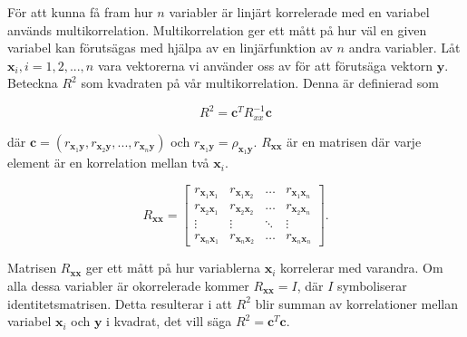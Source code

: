 För att kunna få fram hur $n$ variabler är linjärt korrelerade med en variabel används multikorrelation. Multikorrelation ger ett mått på hur väl en given variabel kan förutsägas med hjälpa av en linjärfunktion av $n$ andra variabler. Låt $\mathbf{x}_{i}, i = 1, 2, ..., n$ vara vektorerna vi använder oss av för att förutsäga vektorn $\mathbf{y}$. Beteckna $R^2$ som kvadraten på vår multikorrelation. Denna är definierad som \cite{Wiki}

\begin{equation}
    R^{2} = \mathbf{c}^{T}R_{xx}^{-1}\mathbf{c}
\end{equation}

\noindent
där $\mathbf{c} = (r_{\mathbf{x}_1\mathbf{y}}, r_{\mathbf{x}_2\mathbf{y}}, ..., r_{\mathbf{x}_n\mathbf{y}})$ och $r_{\mathbf{x}_1\mathbf{y}} = \rho_{\mathbf{x}_1\mathbf{y}}$. $R_{\mathbf{xx}}$ är en matrisen där varje element är en korrelation mellan två $\mathbf{x}_i$. 

 
\begin{equation}
    R_{\mathbf{xx}} = 
    \begin{bmatrix}
    r_{\mathbf{x}_1\mathbf{x}_1} & r_{\mathbf{x}_1\mathbf{x}_2} &  \dots  & r_{\mathbf{x}_1\mathbf{x}_n} \\
    r_{\mathbf{x}_2\mathbf{x}_1} & r_{\mathbf{x}_2\mathbf{x}_2} & \dots  & r_{\mathbf{x}_2\mathbf{x}_n} \\
    \vdots & \vdots  & \ddots & \vdots \\
    r_{\mathbf{x}_n\mathbf{x}_1} & r_{\mathbf{x}_n\mathbf{x}_2} & \dots  & r_{\mathbf{x}_n\mathbf{x}_n}
\end{bmatrix}.    
\end{equation}

\noindent
Matrisen $R_\mathbf{xx}$ ger ett mått på hur variablerna $\mathbf{x}_{i}$ korrelerar med varandra. Om alla dessa variabler är okorrelerade kommer $R_\mathbf{xx} = I$, där $I$ symboliserar identitetsmatrisen. Detta resulterar i att $R^2$ blir summan av korrelationer mellan variabel $\mathbf{x}_{i}$ och $\mathbf{y}$ i kvadrat, det vill säga $R^2 = \mathbf{c}^{T}\mathbf{c}$.

